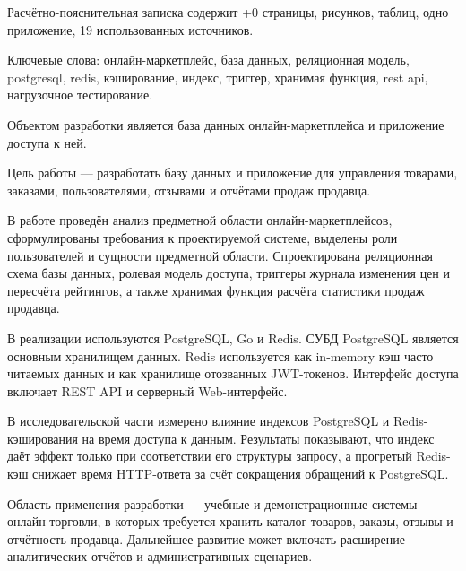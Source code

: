 

\providecommand{\rpzextraaccountedpages}{0}

Расчётно-пояснительная записка содержит \number\numexpr\ztotpages+\rpzextraaccountedpages\relax{} страницы, \totalfigures{} рисунков, \totaltables{} таблиц, одно приложение, 19 использованных источников.

Ключевые слова: онлайн-маркетплейс, база данных, реляционная модель, postgresql, redis, кэширование, индекс, триггер, хранимая функция, rest api, нагрузочное тестирование.

Объектом разработки является база данных онлайн-маркетплейса и приложение доступа к ней.

Цель работы --- разработать базу данных и приложение для управления товарами, заказами, пользователями, отзывами и отчётами продаж продавца.

В работе проведён анализ предметной области онлайн-маркетплейсов, сформулированы требования к проектируемой системе, выделены роли пользователей и сущности предметной области. Спроектирована реляционная схема базы данных, ролевая модель доступа, триггеры журнала изменения цен и пересчёта рейтингов, а также хранимая функция расчёта статистики продаж продавца.

В реализации используются PostgreSQL, Go и Redis. СУБД PostgreSQL является основным хранилищем данных. Redis используется как in-memory кэш часто читаемых данных и как хранилище отозванных JWT-токенов. Интерфейс доступа включает REST API и серверный Web-интерфейс.

В исследовательской части измерено влияние индексов PostgreSQL и Redis-кэширования на время доступа к данным. Результаты показывают, что индекс даёт эффект только при соответствии его структуры запросу, а прогретый Redis-кэш снижает время HTTP-ответа за счёт сокращения обращений к PostgreSQL.

Область применения разработки --- учебные и демонстрационные системы онлайн-торговли, в которых требуется хранить каталог товаров, заказы, отзывы и отчётность продавца. Дальнейшее развитие может включать расширение аналитических отчётов и административных сценариев.

\clearpage
